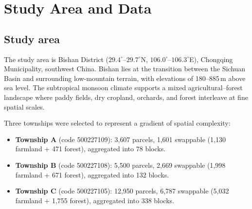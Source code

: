 \documentclass[preprint,12pt]{elsarticle}
\begin{document}
\section{Study Area and Data}
\label{sec:data}

\subsection{Study area}

The study area is Bishan District ($29.4^\circ$--$29.7^\circ$N, $106.0^\circ$--$106.3^\circ$E), Chongqing Municipality, southwest China. Bishan lies at the transition between the Sichuan Basin and surrounding low-mountain terrain, with elevations of 180--885\,m above sea level. The subtropical monsoon climate supports a mixed agricultural--forest landscape where paddy fields, dry cropland, orchards, and forest interleave at fine spatial scales.

Three townships were selected to represent a gradient of spatial complexity:

\begin{itemize}
\item \textbf{Township A} (code 500227109): 3{,}607 parcels, 1{,}601 swappable (1{,}130 farmland + 471 forest), aggregated into 78 blocks.
\item \textbf{Township B} (code 500227108): 5{,}500 parcels, 2{,}669 swappable (1{,}998 farmland + 671 forest), aggregated into 132 blocks.
\item \textbf{Township C} (code 500227105): 12{,}950 parcels, 6{,}787 swappable (5{,}032 farmland + 1{,}755 forest), aggregated into 338 blocks.
\end{itemize}

\begin{table}[htbp]
\centering
\caption{Characteristics of the three study townships and their block-level aggregation. ``Init.\ \textit{baimu}'' indicates the number of \textit{baimu fang} ($\geq$6.67\,ha contiguous farmland) present in the initial land-use configuration before any optimization.}
\label{tab:townships}
\end{table}
\end{document}
